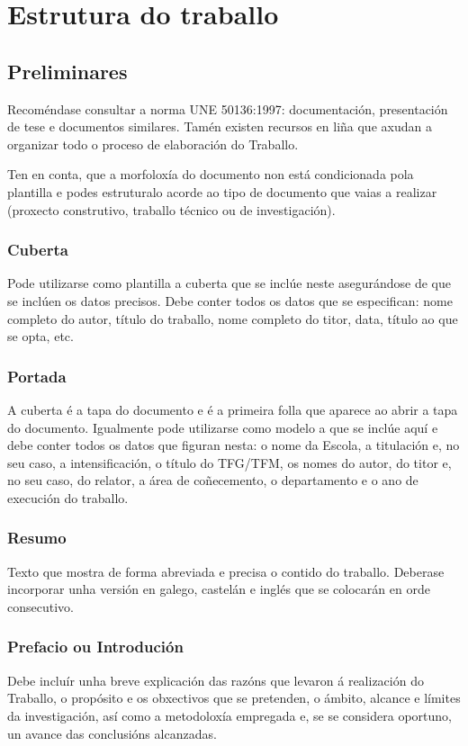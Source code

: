 
\chapter{Estrutura do traballo}

\label{Chapter1} %



\section{Preliminares}
Recoméndase consultar a norma UNE 50136:1997: documentación, presentación de tese e documentos similares. Tamén existen recursos en liña que axudan a organizar todo o proceso de elaboración do Traballo. 

Ten en conta, que a morfoloxía do documento non está condicionada pola plantilla e podes estruturalo acorde ao tipo de documento que vaias a realizar (proxecto construtivo, traballo técnico ou de investigación).

\subsection{Cuberta}
Pode utilizarse como plantilla a cuberta que se inclúe neste asegurándose de que se inclúen os datos precisos. Debe conter todos os datos que se especifican: nome completo do autor, título do traballo, nome completo do titor, data, título ao que se opta, etc.
\subsection{Portada}
A cuberta é a tapa do documento e é a primeira folla que aparece ao abrir a tapa do documento. Igualmente pode utilizarse como modelo a que se inclúe aquí e debe conter todos os datos que figuran nesta: o nome da Escola, a titulación e, no seu caso, a intensificación, o título do TFG/TFM, os nomes do autor, do titor e, no seu caso, do relator, a área de coñecemento, o departamento e o ano de execución do traballo.

\subsection{Resumo}
Texto que mostra de forma abreviada e precisa o contido do traballo. Deberase incorporar unha versión en galego, castelán e inglés que se colocarán en orde consecutivo. 
\subsection{Prefacio ou Introdución}
Debe incluír unha breve explicación das razóns que levaron á realización do Traballo, o propósito e os obxectivos que se pretenden, o ámbito, alcance e límites da investigación, así como a metodoloxía empregada e, se se considera oportuno, un avance das conclusións alcanzadas. 
